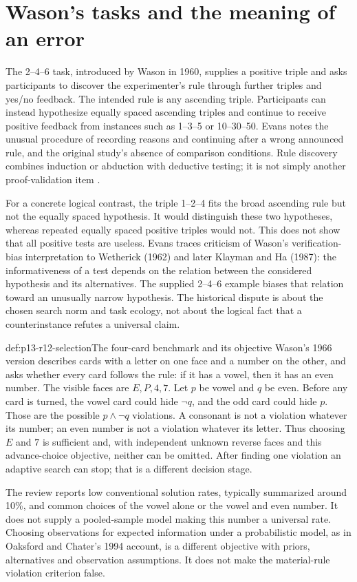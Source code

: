 \section{Wason's tasks and the meaning of an error}

The 2--4--6 task, introduced by Wason in 1960, supplies a positive triple
and asks participants to discover the experimenter's rule through further
triples and yes/no feedback.  The intended rule is any ascending triple.
Participants can instead hypothesize equally spaced ascending triples and
continue to receive positive feedback from instances such as 1--3--5 or
10--30--50.  Evans notes the unusual procedure of recording reasons and
continuing after a wrong announced rule, and the original study's absence of
comparison conditions.  Rule discovery combines induction or abduction with
deductive testing; it is not simply another proof-validation item
\parencite[p.~89]{Evans2021RationalityDebate}.

For a concrete logical contrast, the triple 1--2--4 fits the broad ascending
rule but not the equally spaced hypothesis.  It would distinguish these two
hypotheses, whereas repeated equally spaced positive triples would not.
This does not show that all positive tests are useless.  Evans traces criticism
of Wason's verification-bias interpretation to Wetherick (1962) and later
Klayman and Ha (1987): the informativeness of a test depends on the relation
between the considered hypothesis and its alternatives.  The supplied
2--4--6 example biases that relation toward an unusually narrow hypothesis.
The historical dispute is about the chosen search norm and task ecology,
not about the logical fact that a counterinstance refutes a universal claim.

\begin{hbexample}{def:p13-r12-selection}{The four-card benchmark and its objective}
Wason's 1966 version describes cards with a letter on one face and a number
on the other, and asks whether every card follows the rule: if it has a vowel,
then it has an even number.  The visible faces are \(E,P,4,7\).
Let \(p\) be vowel and \(q\) be even.  Before any card is turned, the
vowel card could hide \(\neg q\), and the odd card could hide \(p\).
Those are the possible \(p\land\neg q\) violations.  A consonant is
not a violation whatever its number; an even number is not a violation
whatever its letter.  Thus choosing \(E\) and \(7\) is sufficient and,
with independent unknown reverse faces and this advance-choice objective,
neither can be omitted.  After finding one violation an adaptive search can
stop; that is a different decision stage.

The review reports low conventional solution rates, typically summarized
around 10\%, and common choices of the vowel alone or the vowel and even
number.  It does not supply a pooled-sample model making this number a
universal rate.  Choosing observations for expected information under a
probabilistic model, as in Oaksford and Chater's 1994 account, is a different
objective with priors, alternatives and observation assumptions.  It does
not make the material-rule violation criterion false.
\end{hbexample}

